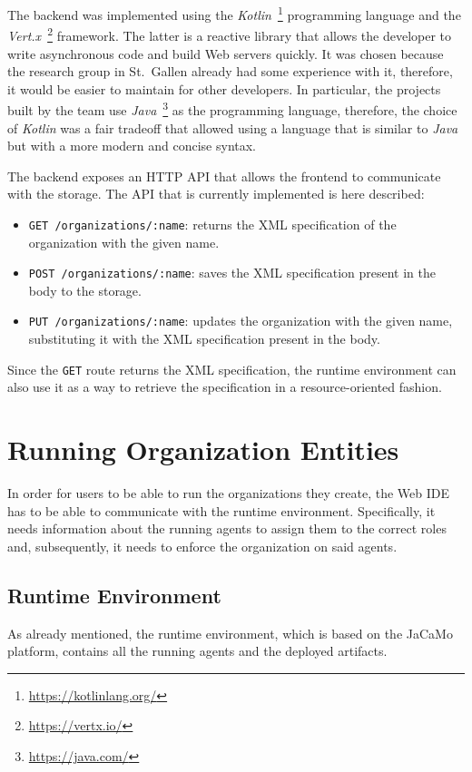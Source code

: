 The backend was implemented using the \textit{Kotlin}~\footnote{\url{https://kotlinlang.org/}} programming language and the \textit{Vert.x}~\footnote{\url{https://vertx.io/}} framework.
The latter is a reactive library that allows the developer to write asynchronous code and build Web servers quickly.
It was chosen because the research group in St.\ Gallen already had some experience with it, therefore, it would be easier to maintain for other developers.
In particular, the projects built by the team use \textit{Java}~\footnote{\url{https://java.com/}} as the programming language, therefore, the choice of \textit{Kotlin} was a fair tradeoff that allowed using a language that is similar to \textit{Java} but with a more modern and concise syntax.

The backend exposes an HTTP API that allows the frontend to communicate with the storage.
The API that is currently implemented is here described:
\begin{itemize}
    \item \texttt{GET /organizations/:name}: returns the XML specification of the organization with the given name.
    \item \texttt{POST /organizations/:name}: saves the XML specification present in the body to the storage.
    \item \texttt{PUT /organizations/:name}: updates the organization with the given name, substituting it with the XML specification present in the body.
\end{itemize}
Since the \texttt{GET} route returns the XML specification, the runtime environment can also use it as a way to retrieve the specification in a resource-oriented fashion.

\section{Running Organization Entities}
In order for users to be able to run the organizations they create, the Web IDE has to be able to communicate with the runtime environment.
Specifically, it needs information about the running agents to assign them to the correct roles and, subsequently, it needs to enforce the organization on said agents.

\subsection{Runtime Environment}
As already mentioned, the runtime environment, which is based on the JaCaMo platform, contains all the running agents and the deployed artifacts.

